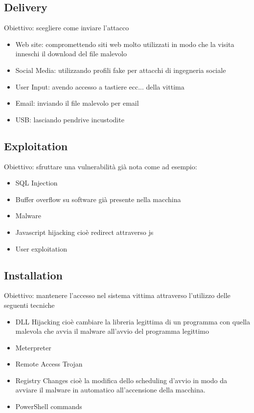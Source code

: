 \subsection{Delivery}
Obiettivo: scegliere come inviare l'attacco
\begin{itemize}[noitemsep]
    \item Web site: compromettendo siti web molto utilizzati in modo che la visita inneschi il download del file malevolo
    \item Social Media: utilizzando profili fake per attacchi di ingegneria sociale
    \item User Input: avendo accesso a tastiere ecc... della vittima
    \item Email: inviando il file malevolo per email
    \item USB: lasciando pendrive incustodite
\end{itemize}


\subsection{Exploitation}
Obiettivo: sfruttare una vulnerabilità già nota come ad esempio:
\begin{itemize}[noitemsep]
    \item SQL Injection
    \item Buffer overflow su software già presente nella macchina
    \item Malware
    \item Javascript hijacking cioè redirect attraverso js
    \item User exploitation
\end{itemize}


\subsection{Installation}
Obiettivo: mantenere l'accesso nel sistema vittima attraverso l'utilizzo delle seguenti tecniche
\begin{itemize}[noitemsep]
    \item DLL Hijacking cioè cambiare la libreria legittima di un programma con quella malevola che avvia il malware all'avvio del programma legittimo
    \item Meterpreter
    \item Remote Access Trojan
    \item Registry Changes cioè la modifica dello scheduling d'avvio in modo da avviare il malware in automatico all'accensione della macchina.
    \item PowerShell commands
\end{itemize}


